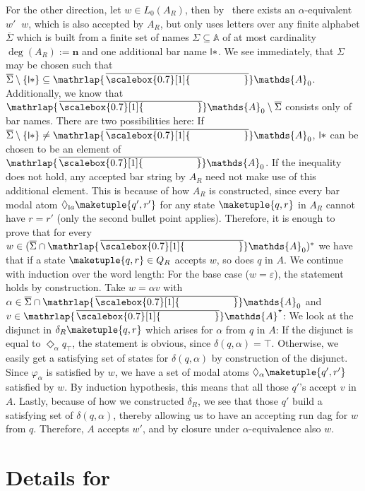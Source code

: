 \documentclass[10pt,a4paper]{amsart}
\theoremstyle{definition}
\newcommand{\seq}{\subseteq}
\newcommand{\At}{\mathds{A}}
\newcommand{\barAs}{\barNames^{\star}}
\newcommand{\names}{\At}
\newcommand{\set}[1]{\{#1\}}
\DeclareMathOperator{\alphaequiv}{\equiv_{\alpha}}
\newcommand{\mybar}[3]{%
  \mathrlap{\hspace{#2}\overline{\scalebox{#1}[1]{\phantom{\ensuremath{#3}}}}}\ensuremath{#3}
}
\newcommand{\barNames}{{\mybar{0.7}{1.25pt}{\names}}}
\newcommand{\midmid}{\hspace{0.2ex}{\rule[-0.1ex]{0.6pt}{1.65ex}}\hspace{0.2ex}}
\newcommand{\scriptmidmid}{\hspace{0.2ex}{\rule[-0.1ex]{0.6pt}{1.1ex}}\hspace{0.2ex}}
\newcommand{\newletter}[1]{{\midmid}#1}
\newcommand{\scriptnew}[1]{{\scriptmidmid}#1}
\begin{document}
\begin{IEEEproof}
  For the other direction, let $w \in L_0(A_R)$, then by~ there exists an
  $\alpha$-equivalent $w' \alphaequiv w$, which is also accepted by $A_R$, but only uses letters over any finite
  alphabet $\overline{\Sigma}$ which is built from a finite set of names $\Sigma \seq
  \names$ of at most cardinality $\deg(A_R) := \mathbf{n}$ and one additional bar name $\newletter{\ast}$.
  We see immediately, that $\Sigma$ may be chosen such that $\overline{\Sigma} \setminus \set{\newletter{\ast}}
  \seq \barNames_0$. Additionally, we know that $\barNames_0 \setminus \overline{\Sigma}$ consists only of
  bar names. There are two possibilities here: If $\overline{\Sigma} \setminus \set{\newletter{\ast}} \neq
  \barNames_0$, $\newletter{\ast}$ can be chosen to be an element of $\barNames_0$. If the inequality
  does not hold, any accepted bar string by $A_R$ need not make use of this additional element.
  This is because of how $A_R$ is constructed, since every bar modal atom $\Diamond_{\scriptnew{a}} \maketuple{q',r'}$
  for any state $\maketuple{q, r}$ in $A_R$ cannot have $r = r'$ (only the second bullet point applies).
  Therefore, it is enough to prove that for every $w \in (\overline{\Sigma} \cap \barNames_0)^*$ we have that
  if a state $\maketuple{q, r} \in Q_R$ accepts $w$, so does $q$ in $A$. We continue with induction over
  the word length: For the base case ($w = \varepsilon$), the statement holds by construction. Take
  $w = \alpha v$ with $\alpha \in \overline{\Sigma} \cap \barNames_0$ and $v \in \barAs$: We look at the
  disjunct in $\delta_R\maketuple{q, r}$ which arises for $\alpha$ from $q$ in $A$: If the disjunct is equal
  to $\Diamond_\alpha q_{\top}$, the statement is obvious, since $\delta(q, \alpha) = \top$. Otherwise,
  we easily get a satisfying set of states for $\delta(q, \alpha)$ by construction of the disjunct. 
  Since $\varphi_{\alpha}$ is satisfied by $w$, we have a set of modal atoms $\Diamond_{\alpha}
  \maketuple{q', r'}$ satisfied by $w$. By induction hypothesis, this means that all those
  $q'$'s accept $v$ in $A$. Lastly, because of how we constructed $\delta_{R}$, we see that
  those $q'$ build a satisfying set of $\delta(q, \alpha)$, thereby allowing us to have an
  accepting run dag for $w$ from $q$. Therefore, $A$ accepts $w'$, and by closure under
  $\alpha$-equivalence also $w$.
\end{IEEEproof}


\section{Details for~} \label{app:secDA}
\end{document}
